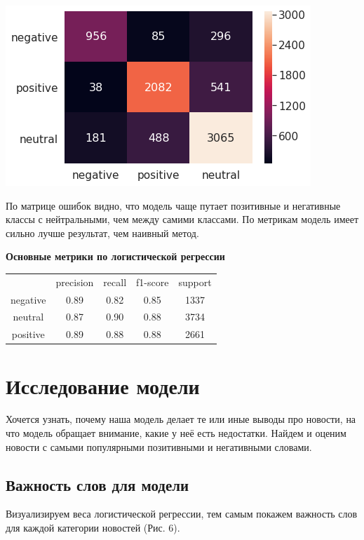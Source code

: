 \documentclass[12pt]{article}
\begin{document}
        \begin{center}
            \includegraphics[scale=0.8]{logreg_heat}
        \end{center}

        По матрице ошибок видно, что модель чаще путает позитивные и негативные классы с нейтральными, 
        чем между самими классами. По метрикам модель имеет сильно лучше результат, чем наивный метод.
        
        \textbf{Основные метрики по логистической регрессии}
        \begin{center}
            \begin{tabular}{ c c c c c}
             & precision & recall & f1-score & support\\ 
             negative & 0.89 & 0.82 & 0.85 & 1337\\ 
             neutral & 0.87 & 0.90 & 0.88 & 3734\\
             positive & 0.89 & 0.88 & 0.88 & 2661
            \end{tabular}
        \end{center}

    \section{Исследование модели}
        
        Хочется узнать, почему наша модель делает те или иные выводы про новости, на что модель обращает внимание,
        какие у неё есть недостатки. Найдем и оценим новости с самыми популярными позитивными и негативными словами.

        \subsection{Важность слов для модели}
            Визуализируем веса логистической регрессии, тем самым покажем важность слов для каждой категории новостей (Рис. 6).
\end{document}
